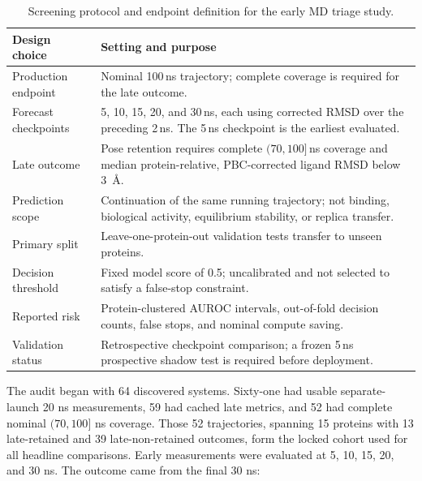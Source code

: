 \documentclass[11pt]{article}
\begin{document}
\begin{table}[t]
  \centering
  \caption{Screening protocol and endpoint definition for the early MD triage study.}
  \label{tab:study_design_summary}
  \small
  \setlength{\tabcolsep}{4pt}
  \renewcommand{\arraystretch}{1.0}
  \begin{tabular}{p{} p{}}
    \toprule
    \textbf{Design choice} & \textbf{Setting and purpose} \\
    \midrule

    Production endpoint &
    Nominal 100\,ns trajectory; complete coverage is required for the late outcome. \\

    Forecast checkpoints &
    5, 10, 15, 20, and 30\,ns, each using corrected RMSD over the preceding 2\,ns. The 5\,ns checkpoint is the earliest evaluated. \\

    Late outcome &
    Pose retention requires complete $(70,100]$\,ns coverage and median protein-relative, PBC-corrected ligand RMSD below 3~\AA. \\

    Prediction scope &
    Continuation of the same running trajectory; not binding, biological activity, equilibrium stability, or replica transfer. \\

    Primary split &
    Leave-one-protein-out validation tests transfer to unseen proteins. \\

    Decision threshold &
    Fixed model score of 0.5; uncalibrated and not selected to satisfy a false-stop constraint. \\

    Reported risk &
    Protein-clustered AUROC intervals, out-of-fold decision counts, false stops, and nominal compute saving. \\

    Validation status &
    Retrospective checkpoint comparison; a frozen 5\,ns prospective shadow test is required before deployment. \\

    \bottomrule
  \end{tabular}
\end{table}


The audit began with 64 discovered systems. Sixty-one had usable separate-launch 20 ns measurements, 59 had cached late metrics, and 52 had complete nominal $(70,100]$ ns coverage. Those 52 trajectories, spanning 15 proteins with 13 late-retained and 39 late-non-retained outcomes, form the locked cohort used for all headline comparisons. Early measurements were evaluated at 5, 10, 15, 20, and 30 ns. The outcome came from the final 30 ns:
\end{document}
